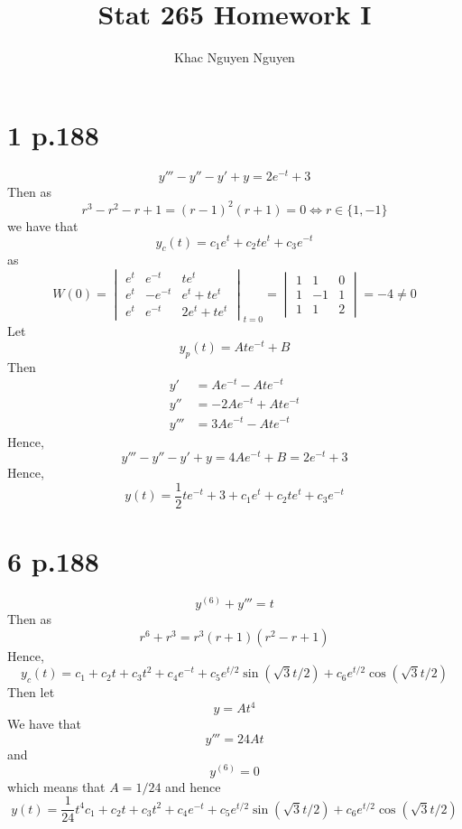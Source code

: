 \documentclass[11pt]{article}
\title{\textbf{Stat 265 Homework I}}
\author{Khac Nguyen Nguyen}
\date{}
\begin{document}
\section*{1 p.188}
\[
    y'''-y''-y'+y = 2e^{-t} + 3    
\]
Then as 
\[
    r^3 - r^2-r+1= (r-1)^2(r+1)=0  \iff r\in \{1,-1\}
\]
we have that 
\[
    y_c(t) = c_1 e^t + c_2 te^t + c_3 e^{-t}    
\]
as 
\[  W(0) = 
    \left.
    \begin{vmatrix}
        e^t & e^{-t} & te^t \\
        e^t & -e^{-t} & e^t + te^t\\
        e^t & e^{-t} & 2e^t + te^t
    \end{vmatrix} \right._{t=0}
    = 
    \begin{vmatrix}
        1 & 1 & 0 \\
        1 & -1 & 1\\
        1 & 1 & 2
    \end{vmatrix}
    = -4 \ne 0
\]
Let 
\[
    y_p(t) = Ate^{-t} + B
\]
Then 
\begin{equation*}
    \begin{aligned}
        y' &= Ae^{-t} - Ate^{-t} \\
        y''&= -2Ae^{-t} + Ate^{-t} \\
        y''' &= 3Ae^{-t} - Ate^{-t}
    \end{aligned}
\end{equation*}
Hence, 
\[
    y''' - y'' - y' + y = 4Ae^{-t} + B = 2e^{-t} + 3
\]
Hence, 
\[
    y(t) = \frac{1}{2}te^{-t} + 3 + c_1 e^t + c_2 te^t + c_3 e^{-t} 
\]
\newpage
\section*{6 p.188}
\[
    y^{(6)} + y''' = t    
\]
Then as 
\[
    r^6 + r^3 = r^3 (r+1)(r^2-r+1)
\]
Hence, 
\[
    y_c(t) = c_1 + c_2t + c_3t^2 + c_4e^{-t} + c_5 e^{t/2}\sin(\sqrt{3}t/2) + c_6 e^{t/2}\cos(\sqrt{3}t/2)     
\]
Then let 
\[
    y = At^4
\]
We have that 
\[
    y''' = 24At
\]
and 
\[
    y^{(6)} = 0
\]
which means that $A = 1/24$ and hence 
\[
    y(t) = \frac{1}{24}t^4  c_1 + c_2t + c_3t^2 + c_4e^{-t} + c_5 e^{t/2}\sin(\sqrt{3}t/2) + c_6 e^{t/2}\cos(\sqrt{3}t/2)     
\]
\newpage
\end{document}
